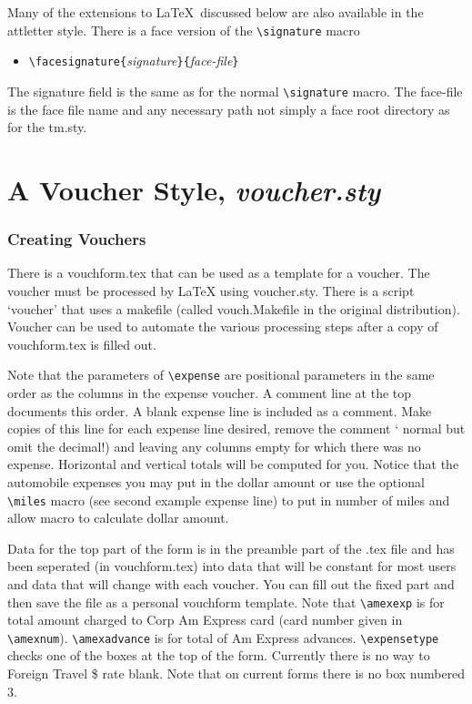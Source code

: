 Many of the extensions to \LaTeX\ discussed below are also available
in the attletter style.  There is a face version of the
\verb|\signature| macro
\begin{itemize}
\item[]
\verb|\facesignature{|{\it signature}\verb|}{|{\it face-file}\verb|}|
\end{itemize}
The signature field is the same as for the normal \verb|\signature|
macro.  The face-file is the face file name and any necessary path not
simply a face root directory as for the tm.sty.

\part{A Voucher Style, {\it voucher.sty}}
\section{Creating Vouchers}

There is a vouchform.tex that can be used as a template for a voucher.
The voucher must be processed by LaTeX using voucher.sty.  There is a
script `voucher' that uses a makefile (called vouch.Makefile in the
original distribution).  Voucher can be used to automate the various
processing steps after a copy of vouchform.tex is filled out.

Note that the parameters of \verb|\expense| are positional parameters in the
same order as the columns in the expense voucher.  A comment line at
the top documents this order.  A blank expense line is included as a
comment.  Make copies of this line for each expense line desired,
remove the comment `%
normal but omit the decimal!) and leaving any columns empty for which
there was no expense.  Horizontal and vertical totals will be computed
for you.  Notice that the automobile expenses you may put in the
dollar amount or use the optional \verb|\miles| macro (see second example
expense line) to put in number of miles and allow macro to calculate
dollar amount.

Data for the top part of the form is in the preamble part of the .tex
file and has been seperated (in vouchform.tex) into data that will be
constant for most users and data that will change with each voucher.
You can fill out the fixed part and then save the file as a personal
vouchform template.  Note that \verb|\amexexp| is for total amount charged to
Corp Am Express card (card number given in \verb|\amexnum|).
\verb|\amexadvance|  is
for total of Am Express advances.  \verb|\expensetype| checks one of the
boxes at the top of the form.  Currently there is no way to Foreign
Travel \$ rate blank.  Note that on current forms there is no box
numbered 3.

